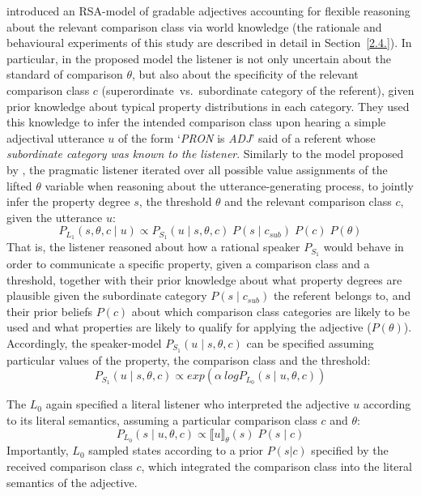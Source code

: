 \textcite{tessler2017warm} introduced an RSA-model of gradable adjectives accounting for flexible reasoning about the relevant comparison class via world knowledge (the rationale and behavioural experiments of this study are described in detail in Section~\ref{2.4.}). In particular, in the proposed model the listener is not only uncertain about the standard of comparison $\theta$, but also about the specificity of the relevant comparison class $c$ (superordinate~vs.~subordinate category of the referent), given prior knowledge about typical property distributions in each category. %
They used this knowledge to infer the intended comparison class upon hearing a simple adjectival utterance $u$ of the form `\emph{PRON} is \emph{ADJ}' said of a referent whose \emph{subordinate category was known to the listener}.
Similarly to the model proposed by \textcite{lassiter2013context}, the pragmatic listener iterated over all possible value assignments of the lifted $\theta$ variable when reasoning about the utterance-generating process, to jointly infer the property degree $s$, the threshold $\theta$ and the relevant comparison class $c$, given the utterance $u$:
\begin{equation}
P_{L_1}(s, \theta, c \mid u) \propto P_{S_1} ( u \mid s, \theta, c) \; P(s \mid c_{sub}) \; P(c) \; P(\theta)
\end{equation} 
That is, the listener reasoned about how a rational speaker $P_{S_1}$ would behave in order to communicate a specific property, given a comparison class and a threshold, together with their prior knowledge about what property degrees are plausible given the subordinate category $P(s \mid c _{sub})$ the referent belongs to, and their prior beliefs $P(c)$ about which comparison class categories are likely to be used and what properties are likely to qualify for applying the adjective ($P(\theta)$). Accordingly, the speaker-model $P_{S_1}( u \mid s, \theta, c)$ can be specified assuming particular values of the property, the comparison class and the threshold:
\begin{equation}
P_{S_1}( u \mid s, \theta, c) \propto exp(\alpha \: log P_{L_0} (s \mid u, \theta, c))
\end{equation}

The $L_0$ again specified a literal listener who interpreted the adjective $u$ according to its literal semantics, assuming a particular comparison class $c$ and $\theta$:
\begin{equation}
P_{L_0}(s \mid u, \theta, c) \propto \llbracket u \rrbracket_{\theta} (s) \; P( s \mid c)
\end{equation}  
Importantly, $L_0$ sampled states according to a prior $P(s|c)$ specified by the received comparison class $c$, which integrated the comparison class into the literal semantics of the adjective. 


